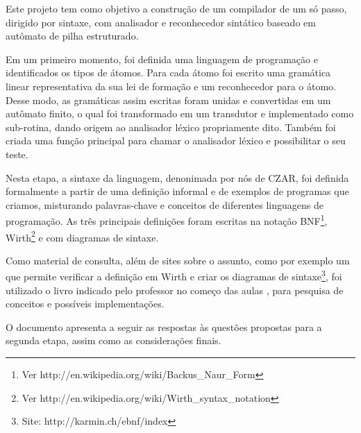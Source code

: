 
Este projeto tem como objetivo a construção de um compilador de um só passo, dirigido por sintaxe, com analisador e reconhecedor sintático baseado em autômato de pilha estruturado.

Em um primeiro momento, foi definida uma linguagem de programação e identificados os tipos de átomos. Para cada átomo foi escrito uma gramática linear representativa da sua lei de formação e um reconhecedor para o átomo. Desse modo, as gramáticas assim escritas foram unidas e convertidas em um autômato finito, o qual foi transformado em um transdutor e implementado como sub-rotina, dando origem ao analisador léxico propriamente dito. Também foi criada uma função principal para chamar o analisador léxico e possibilitar o seu teste.

Nesta etapa, a sintaxe da linguagem, denonimada por nós de CZAR, foi definida formalmente a partir de uma definição informal e de exemplos de programas que criamos, misturando palavras-chave e conceitos de diferentes linguagens de programação. As três principais definições foram escritas na notação BNF\footnote{Ver http://en.wikipedia.org/wiki/Backus\_Naur\_Form}, Wirth\footnote{Ver http://en.wikipedia.org/wiki/Wirth\_syntax\_notation} e com diagramas de sintaxe.

Como material de consulta, além de sites sobre o assunto, como por exemplo um que permite verificar a definição em Wirth e criar os diagramas de sintaxe\footnote{Site: http://karmin.ch/ebnf/index}, foi utilizado o livro indicado pelo professor no começo das aulas \cite{intro-compiladores}, para pesquisa de conceitos e possíveis implementações.

O documento apresenta a seguir as respostas às questões propostas para a segunda etapa, assim como as considerações finais.
